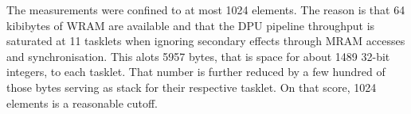 The measurements were confined to at most 1024 elements.
The reason is that 64 kibibytes of WRAM are available and that the DPU pipeline throughput is saturated at 11 tasklets when ignoring secondary effects through MRAM accesses and synchronisation.
This alots 5957 bytes, that is space for about 1489 32-bit integers, to each tasklet.
That number is further reduced by a few hundred of those bytes serving as stack for their respective tasklet.
On that score, 1024 elements is a reasonable cutoff.

\clearpage


\clearpage


\clearpage


\clearpage


\clearpage


\clearpage

